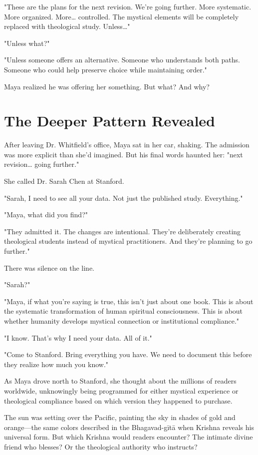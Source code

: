 \documentclass[11pt,twoside]{book}
\begin{document}
"These are the plans for the next revision. We're going further. More systematic. More organized. More\ldots{} controlled. The mystical elements will be completely replaced with theological study. Unless\ldots{}"

"Unless what?"

"Unless someone offers an alternative. Someone who understands both paths. Someone who could help preserve choice while maintaining order."

Maya realized he was offering her something. But what? And why?
\section*{The Deeper Pattern Revealed}
\label{sec:org8145530}

After leaving Dr. Whitfield's office, Maya sat in her car, shaking. The admission was more explicit than she'd imagined. But his final words haunted her: "next revision\ldots{} going further."

She called Dr. Sarah Chen at Stanford.

"Sarah, I need to see all your data. Not just the published study. Everything."

"Maya, what did you find?"

"They admitted it. The changes are intentional. They're deliberately creating theological students instead of mystical practitioners. And they're planning to go further."

There was silence on the line.

"Sarah?"

"Maya, if what you're saying is true, this isn't just about one book. This is about the systematic transformation of human spiritual consciousness. This is about whether humanity develops mystical connection or institutional compliance."

"I know. That's why I need your data. All of it."

"Come to Stanford. Bring everything you have. We need to document this before they realize how much you know."

As Maya drove north to Stanford, she thought about the millions of readers worldwide, unknowingly being programmed for either mystical experience or theological compliance based on which version they happened to purchase.

The sun was setting over the Pacific, painting the sky in shades of gold and orange—the same colors described in the Bhagavad-gītā when Krishna reveals his universal form. But which Krishna would readers encounter? The intimate divine friend who blesses? Or the theological authority who instructs?
\end{document}
